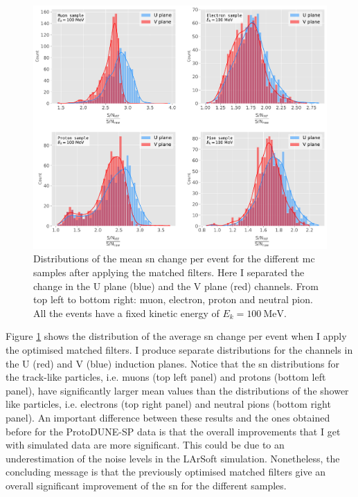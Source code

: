 \begin{figure}[t]
	\centering
	\includegraphics[width=0.9\linewidth]{Images/Matched_Filter/larsoft_sn_hists.pdf}
	\caption[Distributions of the mean \gls{sn} change per event for the different \gls{mc} samples after applying the matched filters.]{Distributions of the mean \gls{sn} change per event for the different \gls{mc} samples after applying the matched filters. Here I separated the change in the U plane (blue) and the V plane (red) channels. From top left to bottom right: muon, electron, proton and neutral pion. All the events have a fixed kinetic energy of $E_{k} = 100 \ \mathrm{MeV}$.}
	\label{fig:mono_summary_hist}
\end{figure}

Figure \ref{fig:mono_summary_hist} shows the distribution of the average \gls{sn} change per event when I apply the optimised matched filters. I produce separate distributions for the channels in the U (red) and V (blue) induction planes. Notice that the \gls{sn} distributions for the track-like particles, i.e. muons (top left panel) and protons (bottom left panel), have significantly larger mean values than the distributions of the shower like particles, i.e. electrons (top right panel) and neutral pions (bottom right panel). An important difference between these results and the ones obtained before for the ProtoDUNE-SP data is that the overall improvements that I get with simulated data are more significant. This could be due to an underestimation of the noise levels in the LArSoft simulation. Nonetheless, the concluding message is that the previously optimised matched filters give an overall significant improvement of the \gls{sn} for the different samples.

